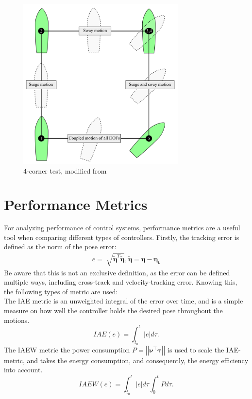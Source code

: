 \begin{figure}[!h]
    \centering
    \includegraphics[width=0.75\textwidth]{fig/4corner.png}
    \caption{4-corner test, modified from \cite{Skjetne2017}}
    \label{fig:4corner}
\end{figure}

\section{Performance Metrics}



For analyzing performance of control systems, performance metrics are a useful tool when comparing different types of controllers. 
Firstly, the tracking error is defined as the norm of the pose error:
\begin{align*}
    e = \sqrt[]{\boldsymbol{\tilde{\eta}}^T\boldsymbol{\tilde{\eta}}},  \boldsymbol{\tilde{\eta}} = \boldsymbol{\eta} - \boldsymbol{\eta_t}
\end{align*}
Be aware that this is not an exclusive definition, as the error can be defined multiple ways, including cross-track and velocity-tracking error. Knowing this, the following types of metric are used: \\



The IAE metric is an unweighted integral of the error over time, and is a simple measure on how well the controller holds the desired pose throughout the motions.
\begin{equation}
IAE(e) = \int_{t_0}^{t} \left|e\right|d\tau .
\end{equation}
The IAEW metric the power consumption $P= \left|\left|\boldsymbol{\nu^{\top}\tau}\right|\right|$ is used to scale the IAE-metric, and takes the energy consumption, and consequently, the energy efficiency into account.
\begin{equation}
IAEW(e) = \int_{t_0}^{t} \left|e\right|d\tau\int_{0}^{t}Pd\tau.
\end{equation}\\

